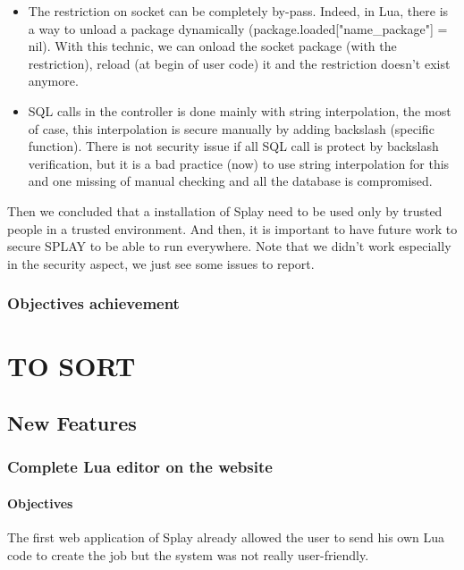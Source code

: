 \documentclass{eplmastersthesis}
\begin{document}
        \begin{itemize}
          \item The restriction on socket can be completely by-pass. Indeed, in Lua, there is a way to unload
          a package dynamically (package.loaded["name_package"] = nil). With this technic, we can onload the socket 
          package (with the restriction), reload (at begin of user code) it and the restriction doesn't exist anymore. 
          \item SQL calls in the controller is done mainly with string interpolation, the most of case, 
          this interpolation is secure manually by adding backslash (specific function). There is not 
          security issue if all SQL call is protect by backslash verification, but it is a bad practice (now)
          to use string interpolation for this and one missing of manual checking and all the database is compromised.
        \end{itemize}

        Then we concluded that a installation of Splay need to be used only by trusted people in a trusted environment. 
        And then, it is important to have future work to secure SPLAY to be able to run everywhere. Note that we didn't 
        work especially in the security aspect, we just see some issues to report.

    \section{Objectives achievement}

\part{TO SORT}

  \chapter{New Features}

    \section{Complete Lua editor on the website}
      \subsection{Objectives}
        The first web application of Splay already allowed the user to send
        his own Lua code to create the job but the system was not really
        user-friendly.\\
\end{document}
